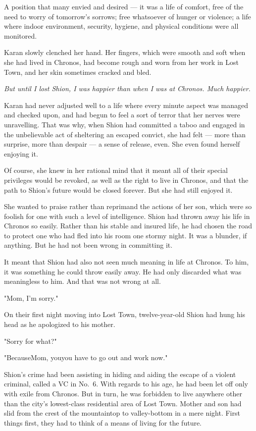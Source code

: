 A position that many envied and desired --- it was a life of comfort, free
of the need to worry of tomorrow's sorrows; free whatsoever of hunger or
violence; a life where indoor environment, security, hygiene, and
physical conditions were all monitored.

Karan slowly clenched her hand. Her fingers, which were smooth and soft
when she had lived in Chronos, had become rough and worn from her work
in Lost Town, and her skin sometimes cracked and bled.

\emph{But until I lost Shion, I was happier than when I was at Chronos. Much
happier.}

Karan had never adjusted well to a life where every minute aspect was
managed and checked upon, and had begun to feel a sort of terror that
her nerves were unravelling. That was why, when Shion had committed a
taboo and engaged in the unbelievable act of sheltering an escaped
convict, she had felt --- more than surprise, more than despair --- a sense
of release, even. She even found herself enjoying it.

Of course, she knew in her rational mind that it meant all of their
special privileges would be revoked, as well as the right to live in
Chronos, and that the path to Shion's future would be closed forever.
But she had still enjoyed it.

She wanted to praise rather than reprimand the actions of her son, which
were so foolish for one with such a level of intelligence. Shion had
thrown away his life in Chronos so easily. Rather than his stable and
insured life, he had chosen the road to protect one who had fled into
his room one stormy night. It was a blunder, if anything. But he had not
been wrong in committing it.

It meant that Shion had also not seen much meaning in life at Chronos.
To him, it was something he could throw easily away. He had only
discarded what was meaningless to him. And that was not wrong at all.

"Mom, I'm sorry."

On their first night moving into Lost Town, twelve-year-old Shion had
hung his head as he apologized to his mother.

"Sorry for what?"

"Because\el Mom, you\el you have to go out and work now."

Shion's crime had been assisting in hiding and aiding the escape of a
violent criminal, called a VC in No.~6. With regards to his age, he had
been let off only with exile from Chronos. But in turn, he was forbidden
to live anywhere other than the city's lowest-class residential area of
Lost Town. Mother and son had slid from the crest of the mountaintop to
valley-bottom in a mere night. First things first, they had to think of
a means of living for the future.


